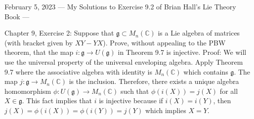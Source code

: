 February 5, 2023
---
My Solutions to Exercise 9.2 of Brian Hall's Lie Theory Book
---

Chapter 9, Exercise 2: Suppose that $\mathfrak{g} \subset M_n(\mathbb{C})$ is a Lie algebra of matrices (with bracket given by $XY-YX$). Prove, without appealing to the PBW theorem, that the map $i:\mathfrak{g}\to U(\mathfrak{g})$ in Theorem 9.7 is injective.
Proof: We will use the universal property of the universal enveloping algebra. Apply Theorem 9.7 where the associative algebra with identity is $M_n(\mathbb{C})$ which contains $\mathfrak{g}$. The map $j:\mathfrak{g}\to M_n(\mathbb{C})$ is the inclusion. Therefore, there exists a unique algebra homomorphism $\phi: U(\mathfrak{g}) \to M_n(\mathbb{C})$ such that $\phi(i(X)) = j(X)$ for all $X\in \mathfrak{g}$. This fact implies that $i$ is injective because if $i(X) = i(Y)$, then $j(X) = \phi(i(X)) = \phi(i(Y)) = j(Y)$ which implies $X=Y$.
